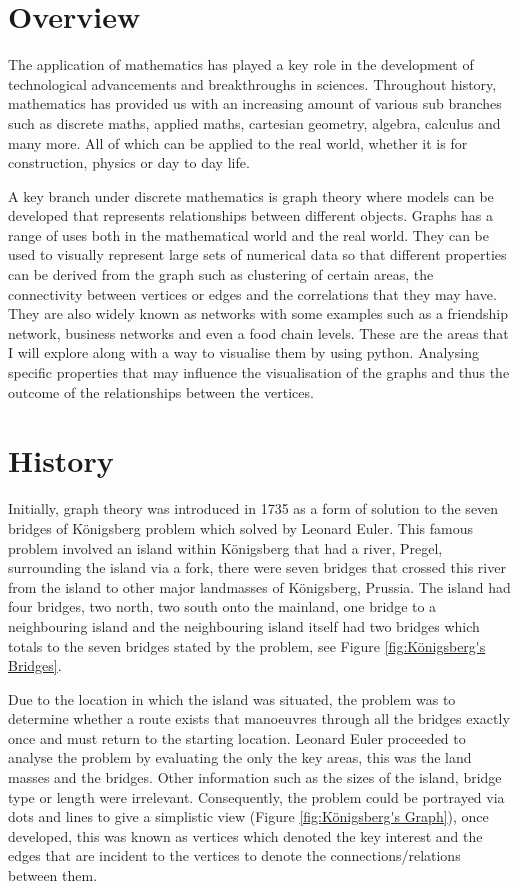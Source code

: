 \section{Overview}
The application of mathematics has played a key role in the development of technological advancements and breakthroughs in sciences. Throughout history, mathematics has provided us with an increasing amount of various sub branches such as discrete maths, applied maths, cartesian geometry, algebra, calculus and many more. All of which can be applied to the real world, whether it is for construction, physics or day to day life. 

A key branch under discrete mathematics is graph theory where models can be developed that represents relationships between different objects. Graphs has a range of uses both in the mathematical world and the real world. They can be used to visually represent large sets of numerical data so that different properties can be derived from the graph such as clustering of certain areas, the connectivity between vertices or edges and the correlations that they may have. They are also widely known as networks with some examples such as a friendship network, business networks and even a food chain levels. These are the areas that I will explore along with a way to visualise them by using python. Analysing specific properties that may influence the visualisation of the graphs and thus the outcome of the relationships between the vertices.

\section{History}
Initially, graph theory was introduced in 1735 as a form of solution to the seven bridges of Königsberg problem which solved by Leonard Euler\cite{POWELL20151}. This famous problem involved an island within Königsberg that had a river, Pregel, surrounding the island via a fork, there were seven bridges that crossed this river from the island to other major landmasses of Königsberg, Prussia. The island had four bridges, two north, two south onto the mainland, one bridge to a neighbouring island and the neighbouring island itself had two bridges which totals to the seven bridges stated by the problem, see Figure \ref{fig:Königsberg's Bridges}. 

Due to the location in which the island was situated, the problem was to determine whether a route exists that manoeuvres through all the bridges exactly once and must return to the starting location. Leonard Euler proceeded to analyse the problem by evaluating the only the key areas, this was the land masses and the bridges. Other information such as the sizes of the island, bridge type or length were irrelevant. Consequently, the problem could be portrayed via dots and lines to give a simplistic view (Figure \ref{fig:Königsberg's Graph}), once developed, this was known as vertices which denoted the key interest and the edges that are incident to the vertices to denote the connections/relations between them. 

